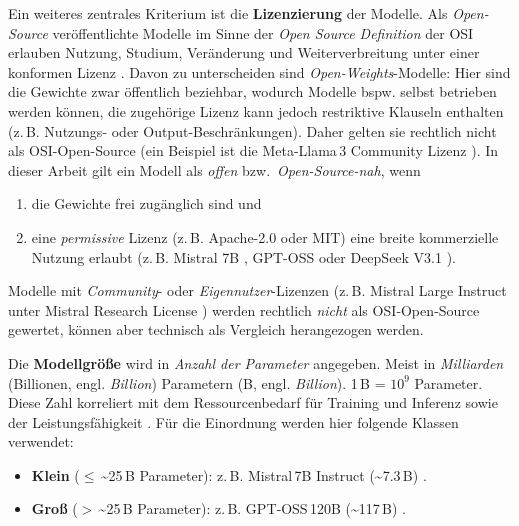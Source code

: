 Ein weiteres zentrales Kriterium ist die \textbf{Lizenzierung} der Modelle. Als \emph{Open-Source} veröffentlichte Modelle im Sinne der \emph{Open Source Definition} der \ac{OSI} erlauben Nutzung, Studium, Veränderung und Weiterverbreitung unter einer konformen Lizenz \cite{OSI_OSD}. Davon zu unterscheiden sind \emph{Open-Weights}-Modelle: Hier sind die Gewichte zwar öffentlich beziehbar, wodurch Modelle bspw. selbst betrieben werden können, die zugehörige Lizenz kann jedoch restriktive Klauseln enthalten (z.\,B. Nutzungs- oder Output-Beschränkungen). Daher gelten sie rechtlich nicht als \ac{OSI}-Open-Source (ein Beispiel ist die Meta-Llama\,3 Community Lizenz \cite{Llama3_License}). In dieser Arbeit gilt ein Modell als \emph{offen} bzw.\ \emph{Open-Source-nah}, wenn

\begin{enumerate}
    \item die Gewichte frei zugänglich sind und
    \item eine \emph{permissive} Lizenz (z.\,B. Apache-2.0 oder MIT) eine breite kommerzielle Nutzung erlaubt (z.\,B. Mistral 7B \cite{HF_Mistral7B_2025}, GPT-OSS \cite{OpenAI_GPTOSS_ModelCard_2025, OpenAI_GPTOSS_Blog_2025} oder DeepSeek V3.1 \cite{HF_DeepSeek_V3_1_2025}).
\end{enumerate}

Modelle mit \emph{Community}- oder \emph{Eigennutzer}-Lizenzen (z.\,B. Mistral Large Instruct unter Mistral Research License \cite{HF_MistralLargeInstruct_2025, MRL_Research_License}) werden rechtlich \emph{nicht} als \ac{OSI}‑Open‑Source gewertet, können aber technisch als Vergleich herangezogen werden.

Die \textbf{Modellgröße} wird in \emph{Anzahl der Parameter} angegeben. Meist in \emph{Milliarden} (Billionen, engl. \emph{Billion}) Parametern (B, engl. \emph{Billion}). 1\,B = \(10^9\) Parameter. Diese Zahl korreliert mit dem Ressourcenbedarf für Training und Inferenz sowie der Leistungsfähigkeit \cite{webdev-llm-sizes}. Für die Einordnung werden hier folgende Klassen verwendet:

\begin{itemize}
    \item \textbf{Klein} (\(\leq\)\,\textasciitilde{}25\,B Parameter): z.\,B. Mistral\,7B Instruct (\textasciitilde{}7.3\,B) \cite{HF_Mistral7B_2025}.
    \item \textbf{Groß} (\(>\)\,\textasciitilde{}25\,B Parameter): z.\,B. GPT‑OSS\,120B (\textasciitilde{}117\,B) \cite{OpenAI_GPTOSS_ModelCard_2025}.
\end{itemize}

